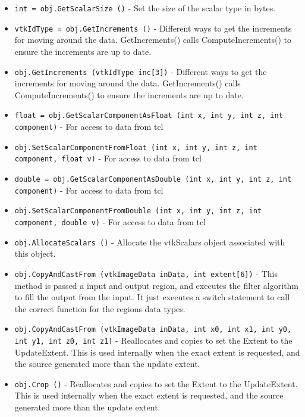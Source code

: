 \begin{itemize}
\item  \verb|int = obj.GetScalarSize ()| -  Set the size of the scalar type in bytes.

\item  \verb|vtkIdType = obj.GetIncrements ()| -  Different ways to get the increments for moving around the data.
 GetIncrements() calls ComputeIncrements() to ensure the increments are
 up to date.

\item  \verb|obj.GetIncrements (vtkIdType inc[3])| -  Different ways to get the increments for moving around the data.
 GetIncrements() calls ComputeIncrements() to ensure the increments are
 up to date.

\item  \verb|float = obj.GetScalarComponentAsFloat (int x, int y, int z, int component)| -  For access to data from tcl

\item  \verb|obj.SetScalarComponentFromFloat (int x, int y, int z, int component, float v)| -  For access to data from tcl

\item  \verb|double = obj.GetScalarComponentAsDouble (int x, int y, int z, int component)| -  For access to data from tcl

\item  \verb|obj.SetScalarComponentFromDouble (int x, int y, int z, int component, double v)| -  For access to data from tcl

\item  \verb|obj.AllocateScalars ()| -  Allocate the vtkScalars object associated with this object.

\item  \verb|obj.CopyAndCastFrom (vtkImageData inData, int extent[6])| -  This method is passed a input and output region, and executes the filter
 algorithm to fill the output from the input.
 It just executes a switch statement to call the correct function for
 the regions data types.

\item  \verb|obj.CopyAndCastFrom (vtkImageData inData, int x0, int x1, int y0, int y1, int z0, int z1)| -  Reallocates and copies to set the Extent to the UpdateExtent.
 This is used internally when the exact extent is requested,
 and the source generated more than the update extent.

\item  \verb|obj.Crop ()| -  Reallocates and copies to set the Extent to the UpdateExtent.
 This is used internally when the exact extent is requested,
 and the source generated more than the update extent.


\end{itemize}

